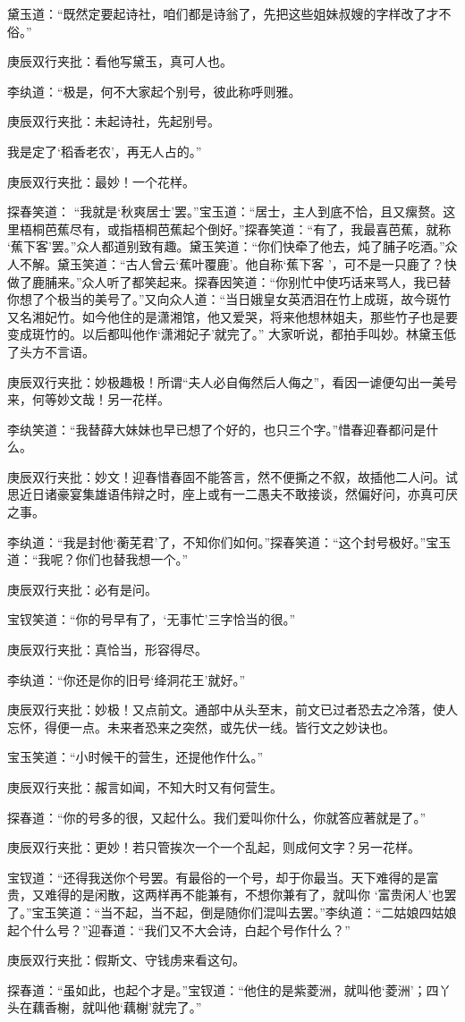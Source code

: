 \begin{parag}
    黛玉道：“既然定要起诗社，咱们都是诗翁了，先把这些姐妹叔嫂的字样改了才不俗。”\begin{note}庚辰双行夹批：看他写黛玉，真可人也。\end{note}李纨道：“极是，何不大家起个别号，彼此称呼则雅。\begin{note}庚辰双行夹批：未起诗社，先起别号。\end{note}我是定了‘稻香老农’，再无人占的。”\begin{note}庚辰双行夹批：最妙！一个花样。\end{note}探春笑道： “我就是‘秋爽居士’罢。”宝玉道：“居士，主人到底不恰，且又瘰赘。这里梧桐芭蕉尽有，或指梧桐芭蕉起个倒好。”探春笑道：“有了，我最喜芭蕉，就称 ‘蕉下客’罢。”众人都道别致有趣。黛玉笑道：“你们快牵了他去，炖了脯子吃酒。”众人不解。黛玉笑道：“古人曾云‘蕉叶覆鹿’。他自称‘蕉下客 ’，可不是一只鹿了？快做了鹿脯来。”众人听了都笑起来。探春因笑道：“你别忙中使巧话来骂人，我已替你想了个极当的美号了。”又向众人道：“当日娥皇女英洒泪在竹上成斑，故今斑竹又名湘妃竹。如今他住的是潇湘馆，他又爱哭，将来他想林姐夫，那些竹子也是要变成斑竹的。以后都叫他作‘潇湘妃子’就完了。” 大家听说，都拍手叫妙。林黛玉低了头方不言语。\begin{note}庚辰双行夹批：妙极趣极！所谓“夫人必自侮然后人侮之”，看因一谑便勾出一美号来，何等妙文哉！另一花样。\end{note}李纨笑道：“我替薛大妹妹也早已想了个好的，也只三个字。”惜春迎春都问是什么。\begin{note}庚辰双行夹批：妙文！迎春惜春固不能答言，然不便撕之不叙，故插他二人问。试思近日诸豪宴集雄语伟辩之时，座上或有一二愚夫不敢接谈，然偏好问，亦真可厌之事。\end{note}李纨道：“我是封他‘蘅芜君’了，不知你们如何。”探春笑道：“这个封号极好。”宝玉道：“我呢？你们也替我想一个。”\begin{note}庚辰双行夹批：必有是问。\end{note}宝钗笑道：“你的号早有了，‘无事忙’三字恰当的很。”\begin{note}庚辰双行夹批：真恰当，形容得尽。\end{note}李纨道：“你还是你的旧号‘绛洞花王’就好。”\begin{note}庚辰双行夹批：妙极！又点前文。通部中从头至末，前文已过者恐去之冷落，使人忘怀，得便一点。未来者恐来之突然，或先伏一线。皆行文之妙诀也。\end{note}宝玉笑道：“小时候干的营生，还提他作什么。”\begin{note}庚辰双行夹批：赧言如闻，不知大时又有何营生。\end{note}探春道：“你的号多的很，又起什么。我们爱叫你什么，你就答应著就是了。”\begin{note}庚辰双行夹批：更妙！若只管挨次一个一个乱起，则成何文字？另一花样。\end{note}宝钗道：“还得我送你个号罢。有最俗的一个号，却于你最当。天下难得的是富贵，又难得的是闲散，这两样再不能兼有，不想你兼有了，就叫你 ‘富贵闲人’也罢了。”宝玉笑道：“当不起，当不起，倒是随你们混叫去罢。”李纨道：“二姑娘四姑娘起个什么号？”迎春道：“我们又不大会诗，白起个号作什么？”\begin{note}庚辰双行夹批：假斯文、守钱虏来看这句。\end{note}探春道：“虽如此，也起个才是。”宝钗道：“他住的是紫菱洲，就叫他‘菱洲’；四丫头在藕香榭，就叫他‘藕榭’就完了。”

\end{parag}
